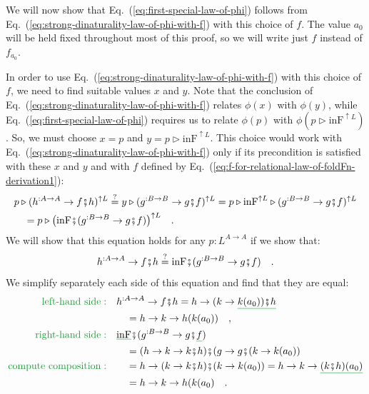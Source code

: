 We will now show that Eq.~(\ref{eq:first-special-law-of-phi}) follows
from Eq.~(\ref{eq:strong-dinaturality-law-of-phi-with-f}) with this
choice of $f$. The value $a_{0}$ will be held fixed throughout most
of this proof, so we will write just $f$ instead of $f_{a_{0}}$.

In order to use Eq.~(\ref{eq:strong-dinaturality-law-of-phi-with-f})
with this choice of $f$, we need to find suitable values $x$ and
$y$. Note that the conclusion of Eq.~(\ref{eq:strong-dinaturality-law-of-phi-with-f})
relates $\phi(x)$ with $\phi(y)$, while Eq.~(\ref{eq:first-special-law-of-phi})
requires us to relate $\phi(p)$ with $\phi(p\triangleright\text{inF}^{\uparrow L})$.
So, we must choose $x=p$ and $y=p\triangleright\text{inF}^{\uparrow L}$.
This choice would work with Eq.~(\ref{eq:strong-dinaturality-law-of-phi-with-f})
only if its precondition is satisfied with these $x$ and $y$ and
with $f$ defined by Eq.~(\ref{eq:f-for-relational-law-of-foldFn-derivation1}):
\begin{align*}
 & p\triangleright(h^{:A\rightarrow A}\rightarrow f\bef h)^{\uparrow L}\overset{?}{=}y\triangleright(g^{:B\rightarrow B}\rightarrow g\bef f)^{\uparrow L}=p\triangleright\text{inF}^{\uparrow L}\triangleright(g^{:B\rightarrow B}\rightarrow g\bef f)^{\uparrow L}\\
 & \quad=p\triangleright\big(\text{inF}\bef(g^{:B\rightarrow B}\rightarrow g\bef f)\big)^{\uparrow L}\quad.
\end{align*}
We will show that this equation holds for any $p:L^{A\rightarrow A}$
if we show that:
\[
h^{:A\rightarrow A}\rightarrow f\bef h\overset{?}{=}\text{inF}\bef(g^{:B\rightarrow B}\rightarrow g\bef f)\quad.
\]
We simplify separately each side of this equation and find that they
are equal:
\begin{align*}
{\color{greenunder}\text{left-hand side}:}\quad & h^{:A\rightarrow A}\rightarrow f\bef h=h\rightarrow(k\rightarrow\gunderline{k(a_{0}))\bef h}\\
 & \quad=h\rightarrow k\rightarrow h(k(a_{0}))\quad,\\
{\color{greenunder}\text{right-hand side}:}\quad & \gunderline{\text{inF}}\bef(g^{:B\rightarrow B}\rightarrow g\bef\gunderline f)\\
 & \quad=(h\rightarrow k\rightarrow k\bef h)\bef(g\rightarrow g\bef(k\rightarrow k(a_{0}))\\
{\color{greenunder}\text{compute composition}:}\quad & \quad=h\rightarrow(k\rightarrow k\bef h)\bef(k\rightarrow k(a_{0}))=h\rightarrow k\rightarrow\gunderline{(k\bef h)(a_{0})}\\
 & \quad=h\rightarrow k\rightarrow h(k(a_{0})\quad.
\end{align*}

